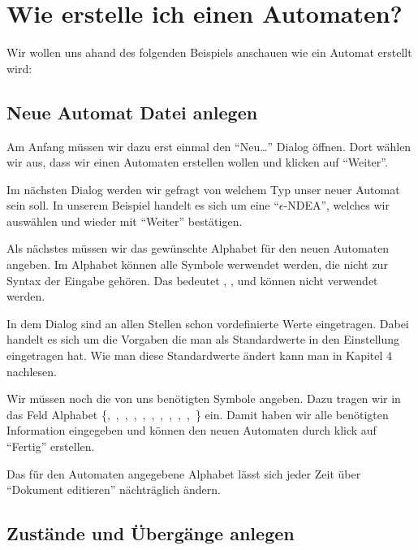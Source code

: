 \chapter{Wie erstelle ich einen Automaten?}

Wir wollen uns ahand des folgenden Beispiels anschauen wie ein Automat erstellt
wird:\vspace{10pt}

\section{Neue Automat Datei anlegen}

Am Anfang müssen wir dazu erst einmal den "`Neu\ldots"' Dialog öffnen. Dort
wählen wir aus, dass wir einen Automaten erstellen wollen und klicken
auf "`Weiter"'.\vspace{10pt}

Im nächsten Dialog werden wir gefragt von welchem Typ unser neuer
Automat sein soll. In unserem Beispiel handelt es sich um eine
"`$\epsilon$-NDEA"', welches wir auswählen und wieder mit "`Weiter"'
bestätigen.\vspace{10pt}

Als nächstes müssen wir das gewünschte Alphabet für den neuen Automaten
angeben. Im Alphabet können alle Symbole werwendet werden, die nicht zur Syntax
der Eingabe gehören. Das bedeutet \Symbol{,}, \Symbol{\{}, \Symbol{\}} und
\SymbolEmpty{} können nicht verwendet werden.\vspace{10pt}

In dem Dialog sind an allen Stellen schon vordefinierte Werte eingetragen.
Dabei handelt es sich um die Vorgaben die man als Standardwerte in den
Einstellung eingetragen hat. Wie man diese Standardwerte ändert kann man in Kapitel $4$ nachlesen.\vspace{10pt}

Wir müssen noch die von uns benötigten Symbole angeben. Dazu tragen wir in das
Feld Alphabet \{,\ ,\ ,\ ,\
,\ ,\ ,\ ,\ ,\ ,\
\Symbol{-}\} ein. Damit haben wir alle benötigten Information eingegeben und
können den neuen Automaten durch klick auf "`Fertig"' erstellen.\vspace{10pt}
\vspace{10pt} 

Das für den Automaten angegebene Alphabet lässt sich jeder Zeit über "`Dokument
editieren"' nächträglich ändern.

\section{Zustände und Übergänge anlegen}

